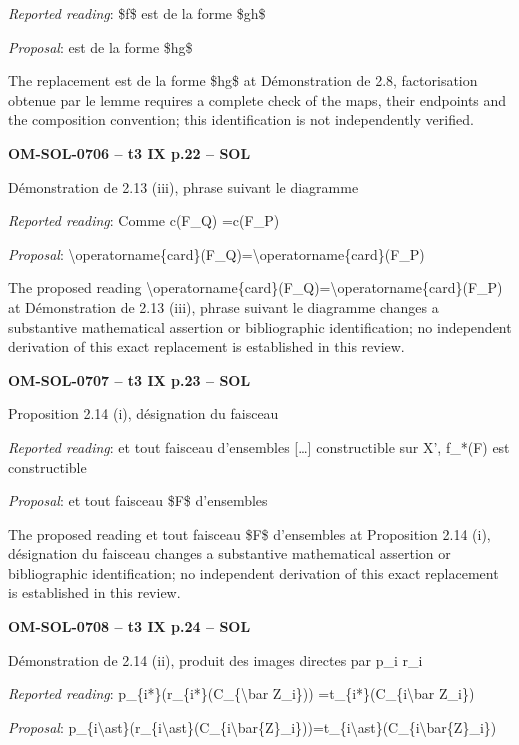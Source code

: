 \emph{Reported reading}: \$f\$ est de la forme \$gh\$\par
\emph{Proposal}: est de la forme \$hg\$\par
The replacement est de la forme \$hg\$ at Démonstration de 2.8, factorisation obtenue par le lemme requires a complete check of the maps, their endpoints and the composition convention; this identification is not independently verified.\par
\par\noindent\textbf{OM-SOL-0706 -- t3 IX p.22 -- SOL}\par
Démonstration de 2.13 (iii), phrase suivant le diagramme\par
\emph{Reported reading}: Comme c(F\_Q) =\allowbreak  c(F\_P)\par
\emph{Proposal}: \textbackslash{}operatorname\{card\}(F\_Q)=\allowbreak \textbackslash{}operatorname\{card\}(F\_P)\par
The proposed reading \textbackslash{}operatorname\{card\}(F\_Q)=\allowbreak \textbackslash{}operatorname\{card\}(F\_P) at Démonstration de 2.13 (iii), phrase suivant le diagramme changes a substantive mathematical assertion or bibliographic identification; no independent derivation of this exact replacement is established in this review.\par
\par\noindent\textbf{OM-SOL-0707 -- t3 IX p.23 -- SOL}\par
Proposition 2.14 (i), désignation du faisceau\par
\emph{Reported reading}: et tout faisceau d'ensembles […] constructible sur X', f\_*(F) est constructible\par
\emph{Proposal}: et tout faisceau \$F\$ d'ensembles\par
The proposed reading et tout faisceau \$F\$ d'ensembles at Proposition 2.14 (i), désignation du faisceau changes a substantive mathematical assertion or bibliographic identification; no independent derivation of this exact replacement is established in this review.\par
\par\noindent\textbf{OM-SOL-0708 -- t3 IX p.24 -- SOL}\par
Démonstration de 2.14 (ii), produit des images directes par p\_i r\_i\par
\emph{Reported reading}: p\_\{i*\}(r\_\{i*\}(C\_\{\textbackslash{}bar Z\_i\})) =\allowbreak  t\_\{i*\}(C\_\{i\textbackslash{}bar Z\_i\})\par
\emph{Proposal}: p\_\{i\textbackslash{}ast\}(r\_\{i\textbackslash{}ast\}(C\_\{i\textbackslash{}bar\{Z\}\_i\}))=\allowbreak t\_\{i\textbackslash{}ast\}(C\_\{i\textbackslash{}bar\{Z\}\_i\})\par
